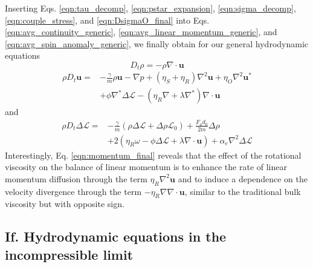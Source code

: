 \documentclass[%
 reprint,
superscriptaddress,
longbibliography,
 amsmath,amssymb,
 prl,
 citeautoscript,
]{revtex4-1}
\begin{document}
Inserting Eqs. \ref{eqn:tau_decomp}, \ref{eqn:pstar_expansion}, \ref{eqn:sigma_decomp}, \ref{eqn:couple_stress}, and \ref{eqn:DsigmaO_final} into Eqs. \ref{eqn:avg_continuity_generic}, \ref{eqn:avg_linear_momentum_generic}, and \ref{eqn:avg_spin_anomaly_generic}, we finally obtain for our general hydrodynamic equations
\begin{equation}
D_t \rho = - \rho \nabla \cdot {\boldsymbol u}
\label{eqn:continuity_final}
\end{equation}
\begin{equation}
\begin{split}
\rho D_t {\boldsymbol u} = &- \frac{\gamma}{m} \rho {\boldsymbol u} - \nabla p + \left( \eta_S + \eta_R \right) \nabla^2 {\boldsymbol u} + \eta_O \nabla^2 {\boldsymbol u}^* \\
&+ \phi \nabla^* \Delta \mathcal{L} - \left( \eta_R \nabla + \lambda \nabla^* \right) \nabla \cdot {\boldsymbol u}
\end{split}
\label{eqn:momentum_final}
\end{equation}
and
\begin{equation}
\begin{split}
\rho D_t \Delta \mathcal{L} = &- \frac{\gamma}{m} \left( \rho \Delta \mathcal{L} + \Delta \rho \mathcal{L}_0 \right) + \frac{F_a d_0}{2m} \Delta \rho \\
&+ 2 \left( \eta_R \omega - \phi \Delta \mathcal{L} + \lambda \nabla \cdot {\boldsymbol u} \right) + \alpha_e \nabla^2 \Delta \mathcal{L}
\end{split}
\label{eqn:spin_final}
\end{equation}
Interestingly, Eq. \ref{eqn:momentum_final} reveals that the effect of the rotational viscosity on the balance of linear momentum is to enhance the rate of linear momentum diffusion through the term $\eta_R \nabla^2 {\boldsymbol u}$ and to induce a dependence on the velocity divergence through the term $- \eta_R \nabla \nabla \cdot {\boldsymbol u}$, similar to the traditional bulk viscosity but with opposite sign.

\subsection{If. Hydrodynamic equations in the incompressible limit}
\end{document}
